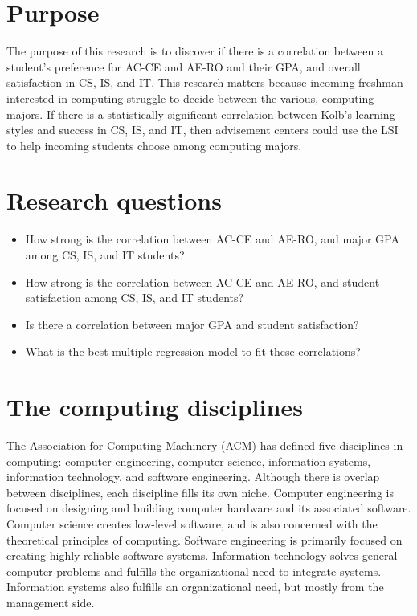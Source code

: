 \section{Purpose}
The purpose of this research is to discover if there is a correlation between a student's preference for AC-CE and AE-RO and their GPA, and overall satisfaction in CS, IS, and IT. This research matters because incoming freshman interested in computing struggle to decide between the various, computing majors. If there is a statistically significant correlation between Kolb's learning styles and success in CS, IS, and IT, then advisement centers could use the LSI to help incoming students choose among computing majors.

\section{Research questions}
\begin{itemize}
  \item How strong is the correlation between AC-CE and AE-RO, and major GPA among CS, IS, and IT students?
  \item How strong is the correlation between AC-CE and AE-RO, and student satisfaction among CS, IS, and IT students?
  \item Is there a correlation between major GPA and student satisfaction?
  \item What is the best multiple regression model to fit these correlations?
\end{itemize}

\section{The computing disciplines}
The Association for Computing Machinery (ACM) has defined five disciplines in computing\citep{shackelford2006}: computer engineering, computer science, information systems, information technology, and software engineering. Although there is overlap between disciplines, each discipline fills its own niche. Computer engineering is focused on designing and building computer hardware and its associated software. Computer science creates low-level software, and is also concerned with the theoretical principles of computing. Software engineering is primarily focused on creating highly reliable software systems. Information technology solves general computer problems and fulfills the organizational need to integrate systems. Information systems also fulfills an organizational need, but mostly from the management side.

